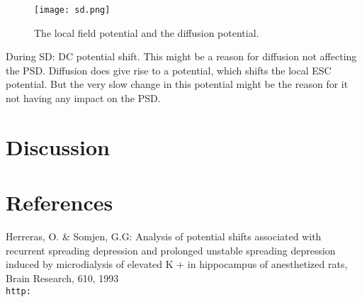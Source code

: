 \documentclass{article}
\begin{document}
\begin{figure}
  \texttt{[image: sd.png]}
  \caption{The local field potential and the diffusion potential. }
  \label{fig:sd}
\end{figure}

During SD: DC potential shift. This might be a reason for diffusion not affecting the PSD. Diffusion does give rise to a potential, which shifts the local ESC potential. But the very slow change in this potential might be the reason for it not having any impact on the PSD.

\section{Discussion}

\section{References}

\begin{thebibliography}{1}
Herreras, O. \& Somjen, G.G: Analysis of potential shifts associated with recurrent spreading
depression and prolonged unstable spreading depression induced by
microdialysis of elevated K + in hippocampus of anesthetized rats,
Brain Research, 610, 1993
\\\texttt{http:}
\end{thebibliography}
\end{document}
